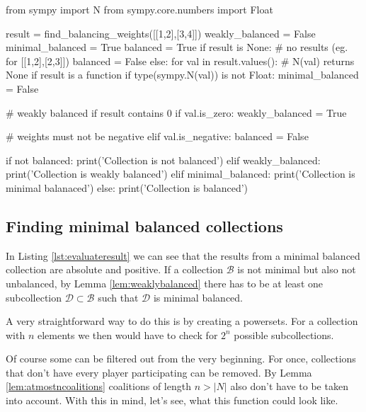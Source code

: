 \documentclass[10pt,a4paper,titlepage]{article}
\theoremstyle{plain}
\theoremstyle{definition}
\begin{document}
\begin{python}[caption="Evaluate result",label=lst:evaluateresult]
from sympy import N
from sympy.core.numbers import Float

result = find_balancing_weights([[1,2],[3,4]])
weakly_balanced = False
minimal_balanced = True
balanced = True
if result is None:
    # no results (eg. for [[1,2],[2,3]])
    balanced = False
else:
    for val in result.values():
        # N(val) returns None if result is a function
        if type(sympy.N(val)) is not Float:
            minimal_balanced = False
        
        # weakly balanced if result contains 0
        if val.is_zero:
            weakly_balanced = True
        
        # weights must not be negative
        elif val.is_negative:
            balanced = False

if not balanced:
    print('Collection is not balanced')
elif weakly_balanced:
    print('Collection is weakly balanced')
elif minimal_balanced:
    print('Collection is minimal balanaced')
else:
    print('Collection is balanced')
\end{python}\vspace{40pt}

\subsection{Finding minimal balanced collections}
In Listing \ref{lst:evaluateresult} we can see that the results from a minimal balanced collection are absolute and positive. If a collection $\mathcal{B}$ is not minimal but also not unbalanced, by Lemma \ref{lem:weaklybalanced} there has to be at least one subcollection $\mathcal{D} \subset \mathcal{B}$ such that $\mathcal{D}$ is minimal balanced.

A very straightforward way to do this is by creating a powersets. For a collection with $n$ elements we then would have to check for $2^n$ possible subcollections.

Of course some can be filtered out from the very beginning. For once, collections that don't have every player participating can be removed. By Lemma \ref{lem:atmostncoalitions} coalitions of length $n > |N|$ also don't have to be taken into account. With this in mind, let's see, what this function could look like.
\end{document}

